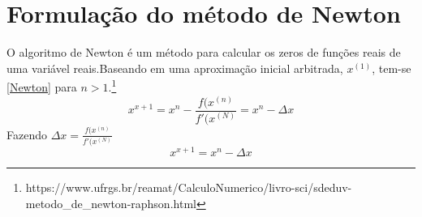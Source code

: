 





\section{Formula\c{c}\~ao do m\'etodo de Newton}
\label{SectionNewton}
O algoritmo de Newton é um método para calcular os zeros de funções reais de uma variável reais.Baseando em uma aproximação inicial arbitrada, $x^{(1)}$, tem-se \ref{Newton} para $n>1$.\footnote{https://www.ufrgs.br/reamat/CalculoNumerico/livro-sci/sdeduv-metodo\_de\_newton-raphson.html}
\begin{equation}
    x^{x+1} = x^{n} - \frac{f(x^{(n)}}{f'(x^{(N)}} = x^{n} - \Delta x
    \label{Newton}
\end{equation}
Fazendo $\Delta x = \frac{f(x^{(n)}}{f'(x^{(N)}}$ 
\begin{equation}
    x^{x+1} = x^{n} - \Delta x
    \label{Newton_Delta}
\end{equation}
